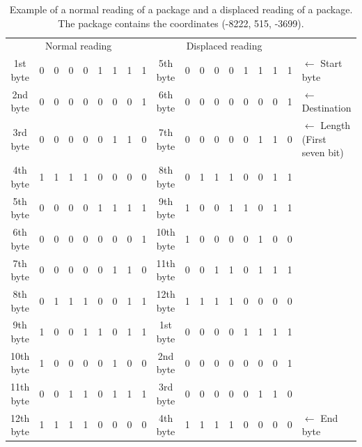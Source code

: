 \begin{table}[H]
\centering
\begin{tabular}{c | m{0.1cm} m{0.1cm} m{0.1cm} m{0.1cm} m{0.1cm} m{0.1cm} m{0.1cm} m{0.1cm} | c | m{0.1cm} m{0.1cm} m{0.1cm} m{0.1cm} m{0.1cm} m{0.1cm} m{0.1cm} m{0.1cm} | l }
\multicolumn{9}{c}{Normal reading} & \multicolumn{9}{c}{Displaced reading} &  \\
\cline{2-9} \cline{11-18}
1st byte & 0 & 0 & 0 & 0 & 1 & 1 & 1 & 1 & 5th byte & 0 & 0 & 0 & 0 & 1 & 1 & 1 & 1 & $\leftarrow$ Start byte \\
\cline{2-9} \cline{11-18}
2nd byte & 0 & 0 & 0 & 0 & 0 & 0 & 0 & 1 & 6th byte & 0 & 0 & 0 & 0 & 0 & 0 & 0 & 1 & $\leftarrow$ Destination \\
\cline{2-9} \cline{11-18}
3rd byte & 0 & 0 & 0 & 0 & 0 & 1 & 1 & 0 & 7th byte & 0 & 0 & 0 & 0 & 0 & 1 & 1 & 0 & $\leftarrow$ Length (First seven bit)\\
\cline{2-9} \cline{11-18}
4th byte & 1 & 1 & 1 & 1 & 0 & 0 & 0 & 0 & 8th byte & 0 & 1 & 1 & 1 & 0 & 0 & 1 & 1 & \\
\cline{2-9} \cline{11-18}
5th byte & 0 & 0 & 0 & 0 & 1 & 1 & 1 & 1 & 9th byte & 1 & 0 & 0 & 1 & 1 & 0 & 1 & 1 & \\
\cline{2-9} \cline{11-18}
6th byte & 0 & 0 & 0 & 0 & 0 & 0 & 0 & 1 & 10th byte & 1 & 0 & 0 & 0 & 0 & 1 & 0 & 0 & \\
\cline{2-9} \cline{11-18}
7th byte & 0 & 0 & 0 & 0 & 0 & 1 & 1 & 0 & 11th byte & 0 & 0 & 1 & 1 & 0 & 1 & 1 & 1 & \\
\cline{2-9} \cline{11-18}
8th byte & 0 & 1 & 1 & 1 & 0 & 0 & 1 & 1 & 12th byte & 1 & 1 & 1 & 1 & 0 & 0 & 0 & 0 & \\
\cline{2-9} \cline{11-18}
9th byte & 1 & 0 & 0 & 1 & 1 & 0 & 1 & 1 & 1st byte & 0 & 0 & 0 & 0 & 1 & 1 & 1 & 1 & \\
\cline{2-9} \cline{11-18}
10th byte & 1 & 0 & 0 & 0 & 0 & 1 & 0 & 0 & 2nd byte & 0 & 0 & 0 & 0 & 0 & 0 & 0 & 1 & \\
\cline{2-9} \cline{11-18}
11th byte & 0 & 0 & 1 & 1 & 0 & 1 & 1 & 1 & 3rd byte & 0 & 0 & 0 & 0 & 0 & 1 & 1 & 0 & \\
\cline{2-9} \cline{11-18}
12th byte & 1 & 1 & 1 & 1 & 0 & 0 & 0 & 0 & 4th byte & 1 & 1 & 1 & 1 & 0 & 0 & 0 & 0 & $\leftarrow$ End byte\\
\cline{2-9} \cline{11-18}
\end{tabular}
\caption{Example of a normal reading of a package and a displaced reading of a package. The package contains the coordinates (-8222, 515, -3699).}
\label{errorPro}
\end{table}

